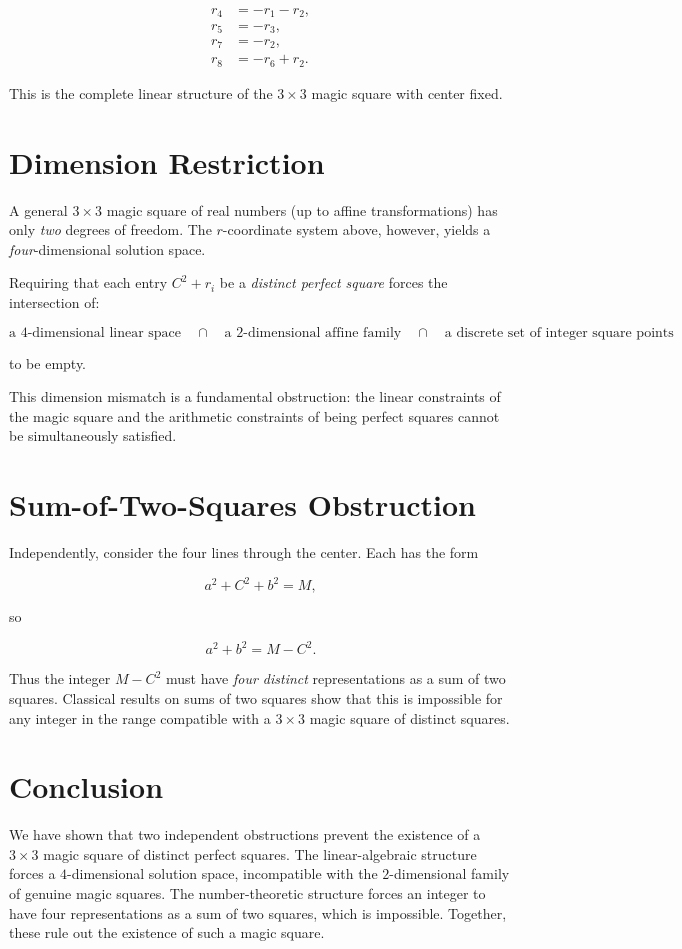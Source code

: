 \documentclass[12pt]{article}
\begin{document}
\[
\begin{aligned}
r_4 &= -r_1 - r_2,\\
r_5 &= -r_3,\\
r_7 &= -r_2,\\
r_8 &= -r_6 + r_2.
\end{aligned}
\]



This is the complete linear structure of the $3\times 3$ magic square with
center fixed.

\section{Dimension Restriction}

A general $3\times 3$ magic square of real numbers (up to affine
transformations) has only \emph{two} degrees of freedom.  The $r$-coordinate
system above, however, yields a \emph{four}-dimensional solution space.

Requiring that each entry $C^2+r_i$ be a \emph{distinct perfect square} forces
the intersection of:


\[
\text{a $4$-dimensional linear space}
\quad\cap\quad
\text{a $2$-dimensional affine family}
\quad\cap\quad
\text{a discrete set of integer square points}
\]


to be empty.

This dimension mismatch is a fundamental obstruction: the linear constraints
of the magic square and the arithmetic constraints of being perfect squares
cannot be simultaneously satisfied.

\section{Sum-of-Two-Squares Obstruction}

Independently, consider the four lines through the center.  Each has the form


\[
a^2 + C^2 + b^2 = M,
\]


so


\[
a^2 + b^2 = M - C^2.
\]



Thus the integer $M - C^2$ must have \emph{four distinct} representations as a
sum of two squares.  Classical results on sums of two squares show that this
is impossible for any integer in the range compatible with a $3\times 3$
magic square of distinct squares.

\section{Conclusion}

We have shown that two independent obstructions prevent the existence of a
$3\times 3$ magic square of distinct perfect squares.  The linear-algebraic
structure forces a $4$-dimensional solution space, incompatible with the
$2$-dimensional family of genuine magic squares.  The number-theoretic
structure forces an integer to have four representations as a sum of two
squares, which is impossible.  Together, these rule out the existence of such
a magic square.
\end{document}
